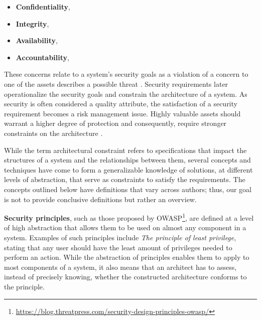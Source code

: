 \begin{itemize}
    \item \textbf{Confidentiality},  \cite{ross_systems_2018}
    \item \textbf{Integrity},  \cite{ross_systems_2018}
    \item \textbf{Availability},  \cite{ross_systems_2018}
    \item \textbf{Accountability},  \cite{ross_systems_2018}
\end{itemize}

These concerns relate to a system's security goals as a violation of a concern to one of the assets describes a possible threat \cite{haley_security_2008}. Security requirements later operationalize the security goals and constrain the architecture of a system. As security is often considered a quality attribute, the satisfaction of a security requirement becomes a risk management issue.  Highly valuable assets should warrant a higher degree of protection and consequently, require stronger constraints on the architecture \cite{broy_software_2007}.

While the term architectural constraint refers to specifications that impact the structures of a system and the relationships between them, several concepts and techniques have come to form a generalizable knowledge of solutions, at different levels of abstraction, that serve as constraints to satisfy the requirements. The concepts outlined below have definitions that vary across authors; thus, our goal is not to provide conclusive definitions but rather an overview. 

\textbf{Security principles}, such as those proposed by OWASP\footnote{\url{https://blog.threatpress.com/security-design-principles-owasp/}}, are defined at a level of high abstraction that allows them to be used on almost any component in a system. Examples of such principles include \textit{The principle of least privilege}, stating that any user should have the least amount of privileges needed to perform an action. While the abstraction of principles enables them to apply to most components of a system, it also means that an architect has to assess, instead of precisely knowing, whether the constructed architecture conforms to the principle. 


